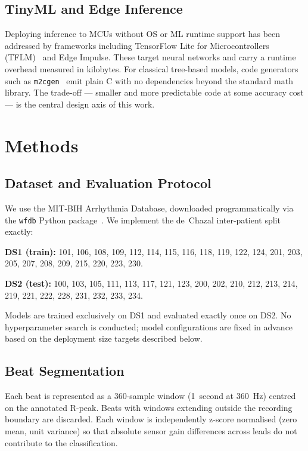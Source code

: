 \documentclass[journal,twoside]{IEEEtran}
\begin{document}
\subsection{TinyML and Edge Inference}
Deploying inference to MCUs without OS or ML runtime support has been
addressed by frameworks including TensorFlow Lite for Microcontrollers
(TFLM)~\cite{David2021} and Edge Impulse. These target neural networks
and carry a runtime overhead measured in kilobytes. For classical
tree-based models, code generators such as \texttt{m2cgen}~\cite{m2cgen}
emit plain C with no dependencies beyond the standard math library.
The trade-off — smaller and more predictable code at some accuracy cost
— is the central design axis of this work.

\section{Methods}

\subsection{Dataset and Evaluation Protocol}
We use the MIT-BIH Arrhythmia Database, downloaded programmatically via
the \texttt{wfdb} Python package~\cite{wfdb}. We implement the de~Chazal
inter-patient split exactly:

\medskip
\noindent\textbf{DS1 (train):} 101, 106, 108, 109, 112, 114, 115, 116,
118, 119, 122, 124, 201, 203, 205, 207, 208, 209, 215, 220, 223, 230.

\noindent\textbf{DS2 (test):} 100, 103, 105, 111, 113, 117, 121, 123,
200, 202, 210, 212, 213, 214, 219, 221, 222, 228, 231, 232, 233, 234.
\medskip

Models are trained exclusively on DS1 and evaluated exactly once on DS2.
No hyperparameter search is conducted; model configurations are fixed in
advance based on the deployment size targets described below.

\subsection{Beat Segmentation}
Each beat is represented as a 360-sample window (1~second at 360~Hz)
centred on the annotated R-peak. Beats with windows extending outside the
recording boundary are discarded. Each window is independently z-score
normalised (zero mean, unit variance) so that absolute sensor gain
differences across leads do not contribute to the classification.
\end{document}
